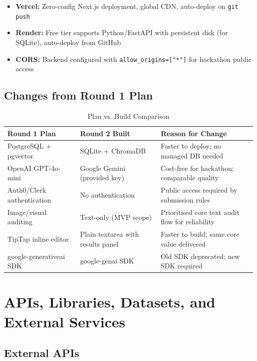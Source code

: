\documentclass[11pt,a4paper]{article}
\begin{document}
\begin{itemize}
    \item \textbf{Vercel:} Zero-config Next.js deployment, global CDN, auto-deploy on \texttt{git push}
    \item \textbf{Render:} Free tier supports Python/FastAPI with persistent disk (for SQLite), auto-deploy from GitHub
    \item \textbf{CORS:} Backend configured with \texttt{allow\_origins=["*"]} for hackathon public access
\end{itemize}

\subsection{Changes from Round 1 Plan}

\begin{table}[H]
\centering
\begin{tabular}{p{} p{} p{}}
\toprule
\textbf{Round 1 Plan} & \textbf{Round 2 Built} & \textbf{Reason for Change} \\
\midrule
PostgreSQL + pgvector & SQLite + ChromaDB & Faster to deploy; no managed DB needed \\
\addlinespace
OpenAI GPT-4o-mini & Google Gemini (provided key) & Cost-free for hackathon; comparable quality \\
\addlinespace
Auth0/Clerk authentication & No authentication & Public access required by submission rules \\
\addlinespace
Image/visual auditing & Text-only (MVP scope) & Prioritised core text audit flow for reliability \\
\addlinespace
TipTap inline editor & Plain textarea with results panel & Faster to build; same core value delivered \\
\addlinespace
google-generativeai SDK & google-genai SDK & Old SDK deprecated; new SDK required \\
\bottomrule
\end{tabular}
\caption{Plan vs. Build Comparison}
\end{table}

\section{APIs, Libraries, Datasets, and External Services}

\subsection{External APIs}
\end{document}
